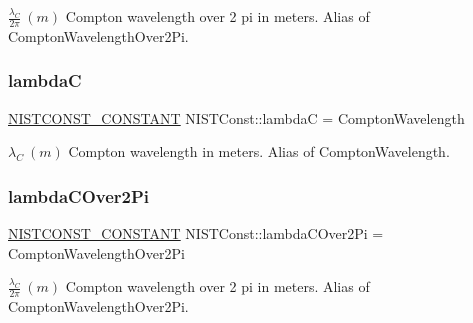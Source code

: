 $\frac{\lambda_C}{2\pi} \ (m)$ Compton wavelength over 2 pi in meters. Alias of Compton\+Wavelength\+Over2\+Pi. \mbox{\label{group___n_i_s_t_const-_compton_wavelength_ga34f6c88f6505a376451da603db7abfc7}} 
\subsubsection{\texorpdfstring{lambdaC}{lambdaC}}
{\footnotesize\ttfamily \mbox{\hyperlink{group___n_i_s_t_const-_macros_ga2b0fc1d7452373f816175dd86ce26729}{N\+I\+S\+T\+C\+O\+N\+S\+T\+\_\+\+C\+O\+N\+S\+T\+A\+NT}} N\+I\+S\+T\+Const\+::lambdaC = Compton\+Wavelength}

$\lambda_C \ (m)$ Compton wavelength in meters. Alias of Compton\+Wavelength. \mbox{\label{group___n_i_s_t_const-_compton_wavelength_ga52564ec6cd189739e0c8c3441b1ea460}} 
\subsubsection{\texorpdfstring{lambda\+C\+Over2\+Pi}{lambdaCOver2Pi}}
{\footnotesize\ttfamily \mbox{\hyperlink{group___n_i_s_t_const-_macros_ga2b0fc1d7452373f816175dd86ce26729}{N\+I\+S\+T\+C\+O\+N\+S\+T\+\_\+\+C\+O\+N\+S\+T\+A\+NT}} N\+I\+S\+T\+Const\+::lambda\+C\+Over2\+Pi = Compton\+Wavelength\+Over2\+Pi}

$\frac{\lambda_C}{2\pi} \ (m)$ Compton wavelength over 2 pi in meters. Alias of Compton\+Wavelength\+Over2\+Pi. 
